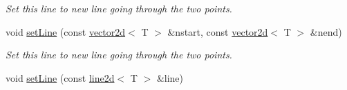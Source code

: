 \begin{DoxyCompactItemize}
\begin{DoxyCompactList}\small\item\em Set this line to new line going through the two points. \end{DoxyCompactList}\item 
void \hyperlink{classirr_1_1core_1_1line2d_a2573eb6b41d08ae4ab16be2630168d3b}{set\+Line} (const \hyperlink{classirr_1_1core_1_1vector2d}{vector2d}$<$ T $>$ \&nstart, const \hyperlink{classirr_1_1core_1_1vector2d}{vector2d}$<$ T $>$ \&nend)\hypertarget{classirr_1_1core_1_1line2d_a2573eb6b41d08ae4ab16be2630168d3b}{}\label{classirr_1_1core_1_1line2d_a2573eb6b41d08ae4ab16be2630168d3b}

\begin{DoxyCompactList}\small\item\em Set this line to new line going through the two points. \end{DoxyCompactList}\item 
void \hyperlink{classirr_1_1core_1_1line2d_af7a159fc82aff5dcab173fcd24934df1}{set\+Line} (const \hyperlink{classirr_1_1core_1_1line2d}{line2d}$<$ T $>$ \&line)\hypertarget{classirr_1_1core_1_1line2d_af7a159fc82aff5dcab173fcd24934df1}{}\label{classirr_1_1core_1_1line2d_af7a159fc82aff5dcab173fcd24934df1}


\end{DoxyCompactItemize}

